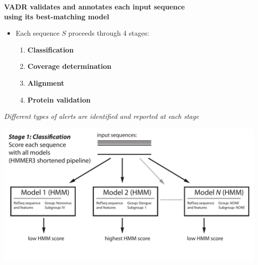 \documentclass[landscape]{slides}
\begin{document}
\begin{slide}
\begin{center}
\large{\textbf{VADR validates and annotates each input sequence \\ using its 
  best-matching model}}

\begin{itemize}
\item Each sequence $S$ proceeds through 4 stages:
\small
\begin{enumerate}
\item \textbf{Classification}
\item \textbf{Coverage determination}
\item \textbf{Alignment}
\item \textbf{Protein validation}
\end{enumerate}
\end{itemize}

\normalsize
\emph{Different types of alerts are identified and reported at each stage}

\end{center}

\vfill
\end{slide}
\begin{slide}
\begin{center}

\includegraphics[width=9.5in]{figs/v-annotate-stage1-1}

\end{center}
\vfill
\end{slide}
\end{document}

